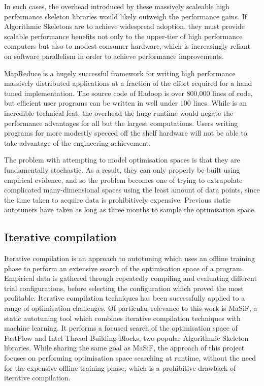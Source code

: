 In such cases, the overhead introduced by these massively scaleable
high performance skeleton libraries would likely outweigh the
performance gains. If Algorithmic Skeletons are to achieve widespread
adoption, they must provide scalable performance benefits not only to
the upper-tier of high performance computers but also to modest
consumer hardware, which is increasingly reliant on software
parallelism in order to achieve performance improvements.

MapReduce is a hugely successful framework for writing high
performance massively distributed applications at a fraction of the
effort required for a hand tuned implementation. The source code of
Hadoop is over 800,000 lines of code, but efficient user programs can
be written in well under 100 lines. While is an incredible technical
feat, the overhead the huge runtime would negate the performance
advantages for all but the largest computations. Users writing
programs for more modestly specced off the shelf hardware will not be
able to take advantage of the engineering achievement.

The problem with attempting to model optimisation spaces is that they
are fundamentally stochastic. As a result, they can only properly be
built using empirical evidence, and so the problem becomes one of
trying to extrapolate complicated many-dimensional spaces using the
least amount of data points, since the time taken to acquire data is
prohibitively expensive. Previous static autotuners have taken as long
as three months to sample the optimisation space.

\subsection{Iterative compilation}
Iterative compilation is an approach to autotuning which uses an
offline training phase to perform an extensive search of the
optimisation space of a program.  Empirical data is gathered through
repeatedly compiling and evaluating different trial configurations,
before selecting the configuration which proved the most
profitable. Iterative compilation techniques has been successfully
applied to a range of optimisation challenges. Of particular relevance
to this work is MaSiF, a static autotuning tool which combines
iterative compilation techniques with machine learning.  It performs a
focused search of the optimisation space of FastFlow and Intel Thread
Building Blocks, two popular Algorithmic Skeleton libraries. While
sharing the same goal as MaSiF, the approach of this project focuses
on performing optimisation space searching at runtime, without the
need for the expensive offline training phase, which is a prohibitive
drawback of iterative compilation.

